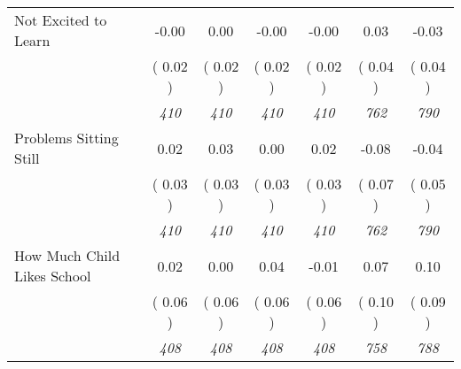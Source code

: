 \begin{tabular}{l c c c c c c}
Not Excited to Learn &     -0.00 &      0.00 &     -0.00 &     -0.00 &      0.03 &     -0.03 \\
& (     0.02 ) & (     0.02 ) & (     0.02 ) & (     0.02 ) & (     0.04 ) & (     0.04 ) \\
& \textit{ 410 } & \textit{ 410 } & \textit{ 410 } & \textit{ 410 } & \textit{ 762 } & \textit{ 790 } \\
Problems Sitting Still &      0.02 &      0.03 &      0.00 &      0.02 &     -0.08 &     -0.04 \\
& (     0.03 ) & (     0.03 ) & (     0.03 ) & (     0.03 ) & (     0.07 ) & (     0.05 ) \\
& \textit{ 410 } & \textit{ 410 } & \textit{ 410 } & \textit{ 410 } & \textit{ 762 } & \textit{ 790 } \\
How Much Child Likes School &      0.02 &      0.00 &      0.04 &     -0.01 &      0.07 &      0.10 \\
& (     0.06 ) & (     0.06 ) & (     0.06 ) & (     0.06 ) & (     0.10 ) & (     0.09 ) \\
& \textit{ 408 } & \textit{ 408 } & \textit{ 408 } & \textit{ 408 } & \textit{ 758 } & \textit{ 788 } \\
\bottomrule
\end{tabular}

